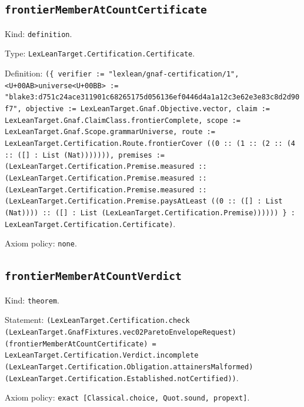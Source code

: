 \documentclass[11pt]{article}
\begin{document}
\subsection*{\texttt{frontierMemberAtCountCertificate}}
\noindent Kind: \texttt{definition}.\par
\noindent Type: \texttt{LexLeanTarget.Certification.Certificate}.\par
\noindent Definition: \texttt{(\{ verifier := "lexlean/gnaf-certification/1", <U+00AB>universe<U+00BB> := "blake3:d751c24ace311901c68265175d056136ef0446d4a1a12c3e62e3e83c8d2d90f7", objective := LexLeanTarget.Gnaf.Objective.vector, claim := LexLeanTarget.Gnaf.ClaimClass.frontierComplete, scope := LexLeanTarget.Gnaf.Scope.grammarUniverse, route := LexLeanTarget.Certification.Route.frontierCover ((0 :: (1 :: (2 :: (4 :: ([] : List (Nat))))))), premises := (LexLeanTarget.Certification.Premise.measured :: (LexLeanTarget.Certification.Premise.measured :: (LexLeanTarget.Certification.Premise.measured :: (LexLeanTarget.Certification.Premise.paysAtLeast ((0 :: ([] : List (Nat)))) :: ([] : List (LexLeanTarget.Certification.Premise)))))) \} : LexLeanTarget.Certification.Certificate)}.\par
\noindent Axiom policy: \texttt{none}.\par
\subsection*{\texttt{frontierMemberAtCountVerdict}}
\noindent Kind: \texttt{theorem}.\par
\noindent Statement: \texttt{(LexLeanTarget.Certification.check (LexLeanTarget.GnafFixtures.vec02ParetoEnvelopeRequest) (frontierMemberAtCountCertificate) = LexLeanTarget.Certification.Verdict.incomplete (LexLeanTarget.Certification.Obligation.attainersMalformed) (LexLeanTarget.Certification.Established.notCertified))}.\par
\noindent Axiom policy: \texttt{exact [Classical.choice, Quot.sound, propext]}.\par
\end{document}
